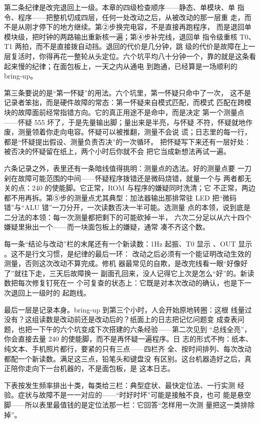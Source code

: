 第二条纪律是改完退回上一级。本章的四级检查顺序——静态、单模块、单
指令、程序——把整机切成四层，任何一处改动之后，从被改动的那一层重
走，而不是从刚才停下的地方继续。第②步换完电容，不是直接再跑程序，
而是退回单模块级，把时钟的两路输出重新核一遍；第④步补完线，退回单
指令级重核 T0、T1 两拍，而不是直接拨自动挡。退回的代价是几分钟，跳
级的代价是故障在上一层复活时，你得再花一整轮从头定位。六个坑平均八十分钟一个，靠的就是这条看起来慢的纪律；在面包板上，一天之内从通电
到跑通，已经算是一场顺利的 bring-up。

第三条要说的是“第一怀疑”的用法。六个坑里，第一怀疑只命中了一次，
这不是记录者笨拙，而是硬件故障的常态：第一怀疑来自模式匹配，而模式
匹配在跨模块的故障面前经常指错方向。它的真正用途不是命中，而是决定
第一个测量点——怀疑 555 坏了，于是先量输出脚；量出来是半亮，与怀疑
不符，怀疑就地作废，测量领着你走向电容。怀疑可以被推翻，测量不会说
谎；日志里的每一行，都是“怀疑提出假设、测量负责否决”的一次循环。
把怀疑写下来还有一层好处：被否决的怀疑留在纸上，两个小时后你就不会
把它当成新想法再试一遍。

六条记录之外，表里还有一条暗线值得挑明：测量点的选法。好的测量点要
一刀剁在故障可能范围的中间——怀疑程序拨错还是微码烧错，就量一个与
两者都无关的点：240 的使能脚。它正常，ROM 与程序的嫌疑同时洗清；它
不正常，两边都不用再拆。第⑤步的测量点尤其典型：加法器输出那排常驻
LED 把“微码错”与“ALU 错”一刀分开，一次读数否决一半可能。选测量
点的本领，说到底是二分法的本领：每一次测量都把剩下的可能砍掉一半，
六次二分足以从六十四个嫌疑里揪出一个——而一块面包板上的嫌疑，通常
凑不齐这个数。

每一条“结论与改动”栏的末尾还有一个新读数：1Hz 起振、T0 显示
、OUT 显示 。这不是行文习惯，是纪律的最后一环：
改动之后必须有一个能证明改动生效的测量，否则这次改动不算完成。修机
器最常见的自欺，是改完线看一眼“好像好了”就往下走，三天后故障换一
副面孔回来，没人记得它上次是怎么“好”的。新读数把每次修复钉死在一
个可复查的状态上：它既是对本次改动的确认，也是下一次退回上一级时的
起跑线。

最后一层是记录本身。bring-up 到第三个小时，人会开始原地转圈：这根
线量过没有？这组读数是改动前还是改动后的？纸面上的日志把记忆问题变
成查表问题，也把一下午的六个坑变成下次搭建的六条经验——第二次见到
“总线全亮”，你会直接去量 240 的使能脚，而不是再怀疑一遍程序。日
志的形式不拘：纸本、纯文本、手机照片都行，要紧的只有三点——四栏齐
全、按时间排列、每次改动都配一个新读数。满足这三点，铅笔头和键盘没
有区别。这台机器造好之后，真正陪你走向下一台机器的，不是面包板，是
这本日志。

下表按发生频率排出十类，每类给三栏：典型症状、最快定位法、一行实测
经验。症状与故障不是一一对应的——“时好时坏”可能是接触不良，也可
能是悬空脚——所以表里最值钱的是定位法那一栏：它回答“怎样用一次测
量把这一类排除掉”。

